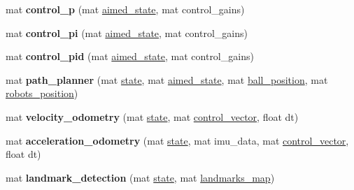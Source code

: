 \begin{DoxyCompactItemize}
mat {\bfseries control\+\_\+p} (mat \hyperlink{class_robot_navigation_aaa625625a2ba01d1602891ea19691462}{aimed\+\_\+state}, mat control\+\_\+gains)
\item 
\mbox{\label{class_robot_navigation_aa00a37c4a425f8ba2b83a208845747f5}} 
mat {\bfseries control\+\_\+pi} (mat \hyperlink{class_robot_navigation_aaa625625a2ba01d1602891ea19691462}{aimed\+\_\+state}, mat control\+\_\+gains)
\item 
\mbox{\label{class_robot_navigation_a5800adf6538584180ca33a2143934dfd}} 
mat {\bfseries control\+\_\+pid} (mat \hyperlink{class_robot_navigation_aaa625625a2ba01d1602891ea19691462}{aimed\+\_\+state}, mat control\+\_\+gains)
\item 
\mbox{\label{class_robot_navigation_a676195ab5a04e08452dc6fb23f84ce10}} 
mat {\bfseries path\+\_\+planner} (mat \hyperlink{class_robot_navigation_a93eb7dd2877e1f72f5741fb396adea81}{state}, mat \hyperlink{class_robot_navigation_aaa625625a2ba01d1602891ea19691462}{aimed\+\_\+state}, mat \hyperlink{class_robot_navigation_a1e4f1a5b3c01ba9be911c006b478f371}{ball\+\_\+position}, mat \hyperlink{class_robot_navigation_a75aaeeea363d928d6dc8c6de90824d3f}{robots\+\_\+position})
\item 
\mbox{\label{class_robot_navigation_a50667808e539f4b632af5f60628cc228}} 
mat {\bfseries velocity\+\_\+odometry} (mat \hyperlink{class_robot_navigation_a93eb7dd2877e1f72f5741fb396adea81}{state}, mat \hyperlink{class_robot_navigation_a73838ceedac8376f3c333fcbfcd4a364}{control\+\_\+vector}, float dt)
\item 
\mbox{\label{class_robot_navigation_a0ca549632dc878d276ab2da06e5ed41b}} 
mat {\bfseries acceleration\+\_\+odometry} (mat \hyperlink{class_robot_navigation_a93eb7dd2877e1f72f5741fb396adea81}{state}, mat imu\+\_\+data, mat \hyperlink{class_robot_navigation_a73838ceedac8376f3c333fcbfcd4a364}{control\+\_\+vector}, float dt)
\item 
\mbox{\label{class_robot_navigation_a94927041a7f2f2bc9c45803a84d5a9d6}} 
mat {\bfseries landmark\+\_\+detection} (mat \hyperlink{class_robot_navigation_a93eb7dd2877e1f72f5741fb396adea81}{state}, mat \hyperlink{class_robot_navigation_a1efd2001bd7cd70cc80d1c05b1c97988}{landmarks\+\_\+map})
\end{DoxyCompactItemize}
